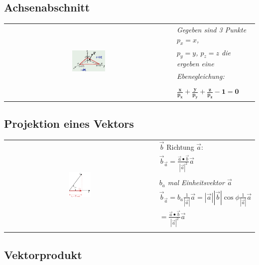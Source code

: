 \subsection{Achsenabschnitt}

\begin{tabular}{cl}
    \multirow{5}{*}{
        \includegraphics[width=0.2\textwidth]{assets/hnfachsenabschnitt.png}
    }
    & \textit{Gegeben sind 3 Punkte $p_x = x$, } \\
    & \textit{$p_y = y$, $p_z = z$ die ergeben eine } \\
    & \textit{Ebenegleichung:} \\
    & \\
    & $\mathbf{\frac{x}{p_x} + \frac{y}{p_y} + \frac{z}{p_z} - 1 = 0}$ \\
\end{tabular}

\subsection{Projektion eines Vektors}

\begin{tabular}{cl}
    \multirow{7}{*}{
        \includegraphics[width=0.15\textwidth]{assets/projection-of-vector.png}
    }
    & $\vec{b}$ Richtung $\vec{a}$:\\
    & $\vec{b}_{\vec{a}} = \frac{\vec{a} \bullet \vec{b}}{|\vec{a}|^2} \vec{a}$\\
    & \\
    & \textit{$b_a$ mal Einheitsvektor $\vec{a}$} \\
    &
        $\vec{b}_{\vec{a}} = b_a \frac{1}{|\vec{a}|} \vec{a} =
        |\vec{a}||\vec{b}|\cos \phi \frac{1}{|\vec{a}|} \vec{a}$ \\
    & $= \frac{\vec{a} \bullet \vec{b}}{|\vec{a}|^2} \vec{a}$\\
    & \\
\end{tabular}

\subsection{Vektorprodukt}

